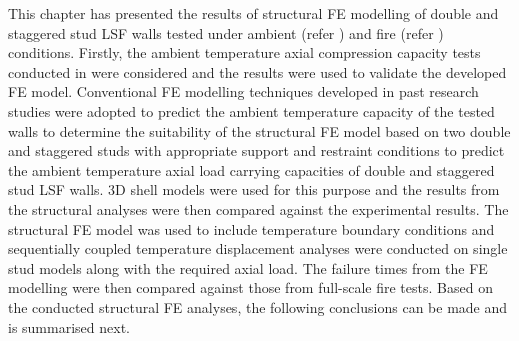 This chapter has presented the results of structural FE modelling of double and staggered stud LSF walls tested under ambient (refer ) and fire (refer ) conditions. Firstly, the ambient temperature axial compression capacity tests conducted in  were considered and the results were used to validate the developed FE model. Conventional FE modelling techniques developed in past research studies were adopted to predict the ambient temperature capacity of the tested walls to determine the suitability of the structural FE model based on two double and staggered studs with appropriate support and restraint conditions to predict the ambient temperature axial load carrying capacities of double and staggered stud LSF walls. 3D shell models were used for this purpose and the results from the structural analyses were then compared against the experimental results. The structural FE model was used to include temperature boundary conditions and sequentially coupled temperature displacement analyses were conducted on single stud models along with the required axial load. The failure times from the FE modelling were then compared against those from full-scale fire tests. Based on the conducted structural FE analyses, the following conclusions can be made and is summarised next.
